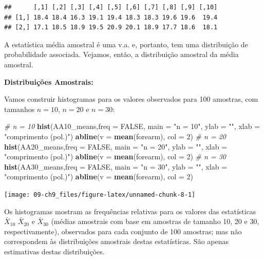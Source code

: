 \documentclass[
]{book}
\newenvironment{Shaded}{\begin{snugshade}}{\end{snugshade}}
\newcommand{\CommentTok}[1]{\textcolor[rgb]{0.56,0.35,0.01}{\textit{#1}}}
\newcommand{\DataTypeTok}[1]{\textcolor[rgb]{0.13,0.29,0.53}{#1}}
\newcommand{\DecValTok}[1]{\textcolor[rgb]{0.00,0.00,0.81}{#1}}
\newcommand{\KeywordTok}[1]{\textcolor[rgb]{0.13,0.29,0.53}{\textbf{#1}}}
\newcommand{\NormalTok}[1]{#1}
\newcommand{\OtherTok}[1]{\textcolor[rgb]{0.56,0.35,0.01}{#1}}
\newcommand{\StringTok}[1]{\textcolor[rgb]{0.31,0.60,0.02}{#1}}
\theoremstyle{definition}
\theoremstyle{definition}
\theoremstyle{definition}
\theoremstyle{remark}
\begin{document}
\begin{verbatim}
##      [,1] [,2] [,3] [,4] [,5] [,6] [,7] [,8] [,9] [,10]
## [1,] 18.4 18.4 16.3 19.1 19.4 18.3 18.3 19.6 19.6  19.4
## [2,] 17.1 18.5 18.9 19.5 20.9 20.1 18.9 17.7 18.6  18.1
\end{verbatim}

A estatística média amostral é uma v.a. e, portanto, tem uma distribuição de probabilidade associada. Vejamos, então, a distribuição amostral da média amostral.

\textbf{Distribuições Amostrais:}

Vamos construir histogramas para os valores observados para 100 amostras, com tamanhos \(n=10\), \(n=20\) e \(n=30\):

\begin{Shaded}
\begin{Highlighting}[]
\CommentTok{# n = 10}
\KeywordTok{hist}\NormalTok{(AA10_means,}\DataTypeTok{freq =} \OtherTok{FALSE}\NormalTok{, }
     \DataTypeTok{main =} \StringTok{"n = 10"}\NormalTok{, }\DataTypeTok{ylab =} \StringTok{""}\NormalTok{, }\DataTypeTok{xlab =} \StringTok{"comprimento (pol.)"}\NormalTok{)}
\KeywordTok{abline}\NormalTok{(}\DataTypeTok{v =} \KeywordTok{mean}\NormalTok{(forearm), }\DataTypeTok{col =} \DecValTok{2}\NormalTok{)}
\CommentTok{# n = 20}
\KeywordTok{hist}\NormalTok{(AA20_means,}\DataTypeTok{freq =} \OtherTok{FALSE}\NormalTok{, }
     \DataTypeTok{main =} \StringTok{"n = 20"}\NormalTok{, }\DataTypeTok{ylab =} \StringTok{""}\NormalTok{, }\DataTypeTok{xlab =} \StringTok{"comprimento (pol.)"}\NormalTok{)}
\KeywordTok{abline}\NormalTok{(}\DataTypeTok{v =} \KeywordTok{mean}\NormalTok{(forearm), }\DataTypeTok{col =} \DecValTok{2}\NormalTok{)}
\CommentTok{# n = 30}
\KeywordTok{hist}\NormalTok{(AA30_means,}\DataTypeTok{freq =} \OtherTok{FALSE}\NormalTok{, }
     \DataTypeTok{main =} \StringTok{"n = 30"}\NormalTok{, }\DataTypeTok{ylab =} \StringTok{""}\NormalTok{, }\DataTypeTok{xlab =} \StringTok{"comprimento (pol.)"}\NormalTok{)}
\KeywordTok{abline}\NormalTok{(}\DataTypeTok{v =} \KeywordTok{mean}\NormalTok{(forearm), }\DataTypeTok{col =} \DecValTok{2}\NormalTok{)}
\end{Highlighting}
\end{Shaded}

\begin{center}\texttt{[image: 09-ch9\_files/figure-latex/unnamed-chunk-8-1]} \end{center}

Os histogramas mostram as frequências relativas para os valores das estatísticas \(\bar{X}_{10}\) \(\bar{X}_{20}\) e \(\bar{X}_{30}\) (médias amostrais com base em amostras de tamanho 10, 20 e 30, respectivamente), observados para cada conjunto de 100 amostras; mas não correspondem às distribuições amostrais destas estatísticas. São apenas estimativas destas distribuições.
\end{document}
